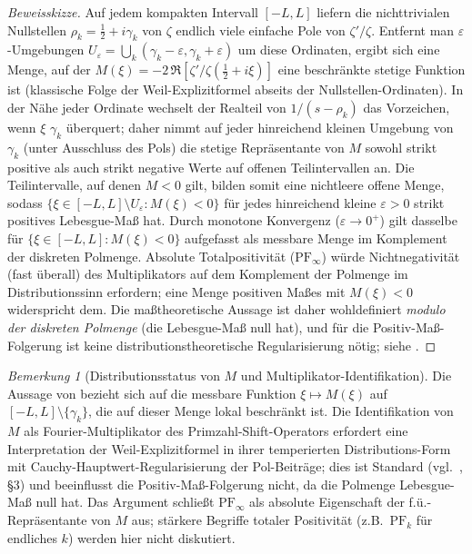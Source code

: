 ﻿\documentclass[12pt,a4paper]{article}
\theoremstyle{definition}
\theoremstyle{remark}
\newtheorem{remark}[theorem]{Bemerkung}
\begin{document}
\begin{proof}[Beweisskizze]
Auf jedem kompakten Intervall $[-L,L]$ liefern die nichttrivialen Nullstellen $\rho_k = \tfrac{1}{2}+i\gamma_k$ von $\zeta$ endlich viele einfache Pole von $\zeta'/\zeta$. Entfernt man $\varepsilon$-Umgebungen $U_\varepsilon = \bigcup_k (\gamma_k - \varepsilon, \gamma_k + \varepsilon)$ um diese Ordinaten, ergibt sich eine Menge, auf der $M(\xi) = -2\,\Re[\zeta'/\zeta(\tfrac{1}{2}+i\xi)]$ eine beschränkte stetige Funktion ist (klassische Folge der Weil-Explizitformel abseits der Nullstellen-Ordinaten). In der Nähe jeder Ordinate wechselt der Realteil von $1/(s-\rho_k)$ das Vorzeichen, wenn $\xi$ $\gamma_k$ überquert; daher nimmt auf jeder hinreichend kleinen Umgebung von $\gamma_k$ (unter Ausschluss des Pols) die stetige Repräsentante von $M$ sowohl strikt positive als auch strikt negative Werte auf offenen Teilintervallen an. Die Teilintervalle, auf denen $M < 0$ gilt, bilden somit eine nichtleere offene Menge, sodass $\{\xi \in [-L,L]\setminus U_\varepsilon : M(\xi) < 0\}$ für jedes hinreichend kleine $\varepsilon > 0$ strikt positives Lebesgue-Maß hat. Durch monotone Konvergenz ($\varepsilon \to 0^+$) gilt dasselbe für $\{\xi \in [-L,L] : M(\xi) < 0\}$ aufgefasst als messbare Menge im Komplement der diskreten Polmenge. Absolute Totalpositivität ($\mathrm{PF}_\infty$) würde Nichtnegativität (fast überall) des Multiplikators auf dem Komplement der Polmenge im Distributionssinn erfordern; eine Menge positiven Maßes mit $M(\xi) < 0$ widerspricht dem. Die maßtheoretische Aussage ist daher wohldefiniert \emph{modulo der diskreten Polmenge} (die Lebesgue-Maß null hat), und für die Positiv-Maß-Folgerung ist keine distributionstheoretische Regularisierung nötig; siehe .
\end{proof}

\begin{remark}[Distributionsstatus von $M$ und Multiplikator-Identifikation]
\label{rem:NE-A-distribution-de}
Die Aussage von  bezieht sich auf die messbare Funktion $\xi \mapsto M(\xi)$ auf $[-L,L] \setminus \{\gamma_k\}$, die auf dieser Menge lokal beschränkt ist. Die Identifikation von $M$ als Fourier-Multiplikator des Primzahl-Shift-Operators erfordert eine Interpretation der Weil-Explizitformel in ihrer temperierten Distributions-Form mit Cauchy-Hauptwert-Regularisierung der Pol-Beiträge; dies ist Standard (vgl.~\cite{Connes2026}, \S3) und beeinflusst die Positiv-Maß-Folgerung nicht, da die Polmenge Lebesgue-Maß null hat. Das Argument schließt $\mathrm{PF}_\infty$ als absolute Eigenschaft der f.ü.-Repräsentante von $M$ aus; stärkere Begriffe totaler Positivität (z.B.\ $\mathrm{PF}_k$ für endliches $k$) werden hier nicht diskutiert.
\end{remark}
\end{document}
